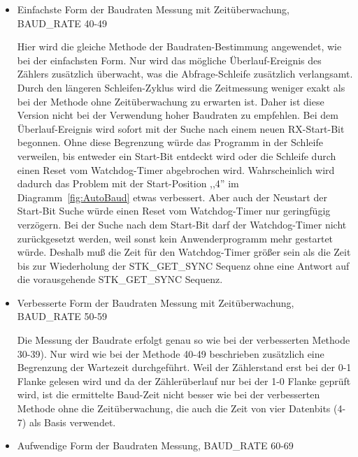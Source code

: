 \begin{itemize}
\item {Einfachste Form der Baudraten Messung mit Zeitüberwachung, BAUD\_RATE 40-49}

Hier wird die gleiche Methode der Baudraten-Bestimmung angewendet, wie bei
der einfachsten Form. 
Nur wird das mögliche Überlauf-Ereignis des Zählers zusätzlich
überwacht, was die Abfrage-Schleife zusätzlich verlangsamt.
Durch den längeren Schleifen-Zyklus wird die Zeitmessung weniger exakt als
bei der Methode ohne Zeitüberwachung zu erwarten ist.
Daher ist diese Version nicht bei der Verwendung hoher Baudraten zu empfehlen.
Bei dem Überlauf-Ereignis wird sofort mit der Suche nach einem neuen RX-Start-Bit
begonnen.
Ohne diese Begrenzung würde das Programm in der
Schleife verweilen, bis entweder ein Start-Bit entdeckt wird oder 
die Schleife durch einen Reset vom Watchdog-Timer abgebrochen wird.
Wahrscheinlich wird dadurch das Problem mit der Start-Position ,,4'' im
Diagramm~\ref{fig:AutoBaud} etwas verbessert.
Aber auch der Neustart der Start-Bit Suche würde einen Reset vom Watchdog-Timer
nur geringfügig verzögern. Bei der Suche nach dem Start-Bit darf der
Watchdog-Timer nicht zurückgesetzt werden, weil sonst kein Anwenderprogramm
mehr gestartet würde. Deshalb muß die Zeit für den Watchdog-Timer größer
sein als die Zeit bis zur Wiederholung der STK\_GET\_SYNC Sequenz
ohne eine Antwort auf die vorausgehende STK\_GET\_SYNC Sequenz.

\item {Verbesserte Form der Baudraten Messung mit Zeitüberwachung, BAUD\_RATE 50-59}

Die Messung der Baudrate erfolgt genau so wie bei der verbesserten Methode 30-39).
Nur wird wie bei der Methode 40-49 beschrieben zusätzlich eine
Begrenzung der Wartezeit durchgeführt.
Weil der Zählerstand erst bei der 0-1 Flanke gelesen wird und da der Zählerüberlauf
nur bei der 1-0 Flanke geprüft wird, ist die ermittelte Baud-Zeit nicht besser wie
bei der verbesserten Methode ohne die Zeitüberwachung, die auch die
Zeit von vier Datenbits (4-7) als Basis verwendet.

\item {Aufwendige Form der Baudraten Messung, BAUD\_RATE 60-69}


\end{itemize}
